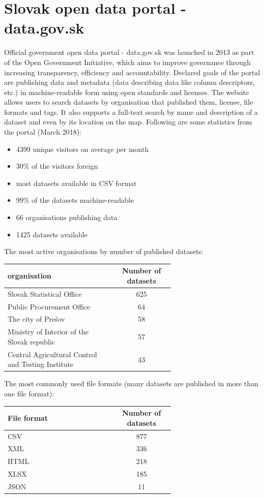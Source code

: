\documentclass[thesis=B,english]{FITthesis}[2012/06/26]
\begin{document}
	\section{Slovak open data portal - data.gov.sk}
	Official government open data portal - data.gov.sk was launched in 2013 as part of the Open Government Initiative, which aims to improve governance through increasing transparency, efficiency and accountability. Declared goals of the portal are publishing data and metadata (data describing data like column descriptors, etc.) in machine-readable form using open standards and licenses. The website allows users to search datasets by organisation that published them, license, file formats and tags. It also supports a full-text search by name and description of a dataset and even by its location on the map.
	Following are some statistics from the portal (March 2018):
	\begin{itemize}
		\item 4399 unique visitors on average per month
		\item 30\% of the visitors foreign 
		\item most datasets available in CSV format
		\item  99\% of the datasets machine-readable
		\item 66 organisations publishing data
		\item 1425 datasets available
	\end{itemize}
	The most active organisations by number of published datasets:
	\begin{center}
	\label{toporganisations}
        \begin{tabular}{  p{0.65\linewidth} | c }
        \textbf{organisation} & \textbf{Number of datasets} \\ \hline
        Slovak Statistical Office & 625 \\
        Public Procurement Office & 64 \\
        The city of Prešov & 58 \\
        Ministry of Interior of the Slovak republic & 57 \\
        Central Agricultural Control and Testing Institute & 43 \\
        \end{tabular}
    \end{center}
    \vspace{20px}
    The most commonly used file formats (many datasets are published in more than one file format):
    \begin{center}
        \begin{tabular}{  p{0.65\linewidth} | c }
        \textbf{File format} & \textbf{Number of datasets} \\ \hline
        CSV & 877 \\
        XML & 336 \\
        HTML & 218 \\
        XLSX & 185 \\
        JSON & 11 \\
        \end{tabular}
    \end{center}
\end{document}
